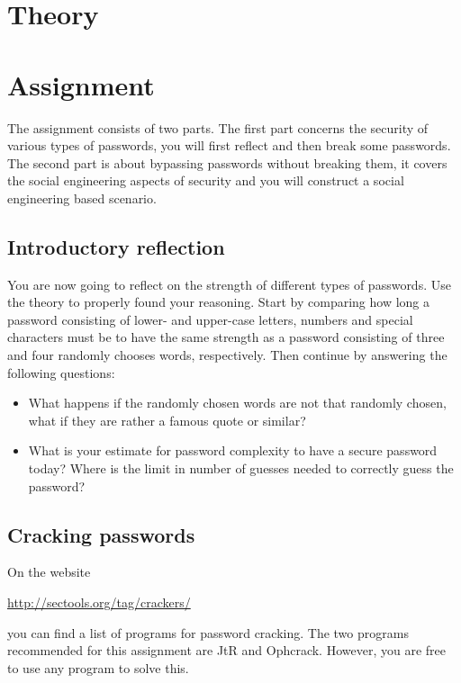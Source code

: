 \section{Theory}%
\label{sec:theory}




\section{Assignment}%
\label{sec:tasks}

The assignment consists of two parts.
The first part concerns the security of various types of passwords, you will 
first reflect and then break some passwords.
The second part is about bypassing passwords without breaking them, it covers 
the social engineering aspects of security and you will construct a social 
engineering based scenario.

\subsection{Introductory reflection}%
\label{sec:reflection}

You are now going to reflect on the strength of different types of passwords.
Use the theory to properly found your reasoning.
Start by comparing how long a password consisting of lower- and upper-case 
letters, numbers and special characters must be to have the same strength as 
a password consisting of three and four randomly chooses words, respectively.
Then continue by answering the following questions:
\begin{itemize}
  \item What happens if the randomly chosen words are not that randomly chosen, 
    what if they are rather a famous quote or similar?

  \item What is your estimate for password complexity to have a secure password 
    today?
    Where is the limit in number of guesses needed to correctly guess the 
    password?
\end{itemize}

\subsection{Cracking passwords}

On the website
\begin{center}
  \url{http://sectools.org/tag/crackers/}
\end{center}
you can find a list of programs for password cracking.
The two programs recommended for this assignment are
\ac{JtR} and Ophcrack.
However, you are free to use any program to solve this.

